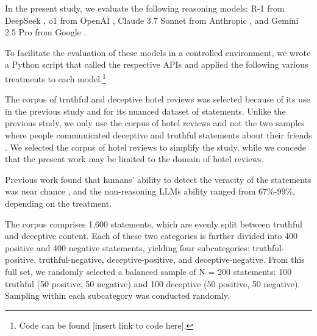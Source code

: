 \documentclass{article}
\begin{document}

In the present study, we evaluate the following reasoning models: R-1 from DeepSeek \citep{deepseek-ai_deepseek-r1_2025}, o1 from OpenAI \citep{openai_openai_2024}, Claude 3.7 Sonnet from Anthropic \citep{anthropic_claude_2025}, and Gemini 2.5 Pro from Google \citep{deepmindGemini}.

To facilitate the evaluation of these models in a controlled environment, we wrote a Python script that called the respective APIs and applied the following various treatments to each model.\footnote{Code can be found [insert link to code here].} %

The corpus of truthful and deceptive hotel reviews \citep{ott_finding_2011} was selected because of its use in the previous study \citep{markowitz_generative_2024} and for its nuanced dataset of statements. Unlike the previous study, we only use the corpus of hotel reviews \citep{ott_finding_2011} and not the two samples where people communicated deceptive and truthful statements about their friends \citep{markowitz_when_2020, lloyd_miami_2019}. We selected the corpus of hotel reviews to simplify the study, while we concede that the present work may be limited to the domain of hotel reviews.

Previous work \citep{markowitz_generative_2024} found that humans' ability to detect the veracity of the statements was near chance \citep{markowitz_generative_2024}, and the non-reasoning LLMs ability ranged from 67\%-99\%, depending on the treatment.

The corpus comprises 1,600 statements, which are evenly split between truthful and deceptive content. Each of these two categories is further divided into 400 positive and 400 negative statements, yielding four subcategories: truthful-positive, truthful-negative, deceptive-positive, and deceptive-negative. From this full set, we randomly selected a balanced sample of N = 200 statements: 100 truthful (50 positive, 50 negative) and 100 deceptive (50 positive, 50 negative). Sampling within each subcategory was conducted randomly.

\end{document}
